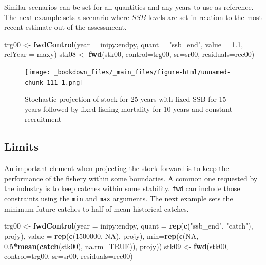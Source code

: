 \documentclass[
]{book}
\newenvironment{Shaded}{\begin{snugshade}}{\end{snugshade}}
\newcommand{\AttributeTok}[1]{\textcolor[rgb]{0.13,0.29,0.53}{#1}}
\newcommand{\ConstantTok}[1]{\textcolor[rgb]{0.56,0.35,0.01}{#1}}
\newcommand{\DecValTok}[1]{\textcolor[rgb]{0.00,0.00,0.81}{#1}}
\newcommand{\FloatTok}[1]{\textcolor[rgb]{0.00,0.00,0.81}{#1}}
\newcommand{\FunctionTok}[1]{\textcolor[rgb]{0.13,0.29,0.53}{\textbf{#1}}}
\newcommand{\NormalTok}[1]{#1}
\newcommand{\OtherTok}[1]{\textcolor[rgb]{0.56,0.35,0.01}{#1}}
\newcommand{\SpecialCharTok}[1]{\textcolor[rgb]{0.81,0.36,0.00}{\textbf{#1}}}
\newcommand{\StringTok}[1]{\textcolor[rgb]{0.31,0.60,0.02}{#1}}
\begin{document}
Similar scenarios can be set for all quantities and any years to use as reference. The next example sets a scenario where \(SSB\) levels are set in relation to the most recent estimate out of the assessmeent.

\begin{Shaded}
\begin{Highlighting}[]
\NormalTok{trg00 }\OtherTok{\textless{}{-}} \FunctionTok{fwdControl}\NormalTok{(}\AttributeTok{year =}\NormalTok{ inipy}\SpecialCharTok{:}\NormalTok{endpy, }\AttributeTok{quant =} \StringTok{"ssb\_end"}\NormalTok{, }\AttributeTok{value =} \FloatTok{1.1}\NormalTok{, }\AttributeTok{relYear =}\NormalTok{ maxy)}
\NormalTok{stk08 }\OtherTok{\textless{}{-}} \FunctionTok{fwd}\NormalTok{(stk00, }\AttributeTok{control=}\NormalTok{trg00, }\AttributeTok{sr=}\NormalTok{sr00, }\AttributeTok{residuals=}\NormalTok{rec00)}
\end{Highlighting}
\end{Shaded}

\begin{figure}
\centering
\texttt{[image: \_bookdown\_files/\_main\_files/figure-html/unnamed-chunk-111-1.png]}
\caption{\label{fig:unnamed-chunk-111}Stochastic projection of stock for 25 years with fixed SSB for 15 years followed by fixed fishing mortality for 10 years and constant recruitment}
\end{figure}

\hypertarget{limits}{%
\subsection{Limits}\label{limits}}

An important element when projecting the stock forward is to keep the performance of the fishery within some boundaries. A common one requested by the industry is to keep catches within some stability. \texttt{fwd} can include those constraints using the \texttt{min} and \texttt{max} arguments. The next example sets the minimum future catches to half of mean historical catches.

\begin{Shaded}
\begin{Highlighting}[]
\NormalTok{trg00 }\OtherTok{\textless{}{-}} \FunctionTok{fwdControl}\NormalTok{(}\AttributeTok{year =}\NormalTok{ inipy}\SpecialCharTok{:}\NormalTok{endpy, }\AttributeTok{quant =} \FunctionTok{rep}\NormalTok{(}\FunctionTok{c}\NormalTok{(}\StringTok{"ssb\_end"}\NormalTok{, }\StringTok{"catch"}\NormalTok{), projy), }\AttributeTok{value =} \FunctionTok{rep}\NormalTok{(}\FunctionTok{c}\NormalTok{(}\DecValTok{1500000}\NormalTok{, }\ConstantTok{NA}\NormalTok{), projy), }\AttributeTok{min=}\FunctionTok{rep}\NormalTok{(}\FunctionTok{c}\NormalTok{(}\ConstantTok{NA}\NormalTok{, }\FloatTok{0.5}\SpecialCharTok{*}\FunctionTok{mean}\NormalTok{(}\FunctionTok{catch}\NormalTok{(stk00), }\AttributeTok{na.rm=}\ConstantTok{TRUE}\NormalTok{)), projy))}
\NormalTok{stk09 }\OtherTok{\textless{}{-}} \FunctionTok{fwd}\NormalTok{(stk00, }\AttributeTok{control=}\NormalTok{trg00, }\AttributeTok{sr=}\NormalTok{sr00, }\AttributeTok{residuals=}\NormalTok{rec00)}
\end{Highlighting}
\end{Shaded}
\end{document}
